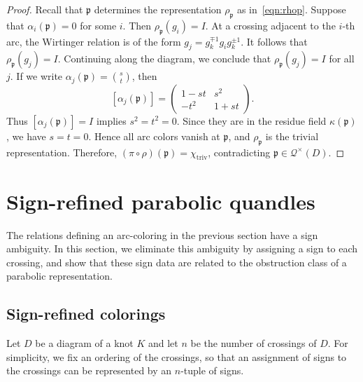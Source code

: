 \documentclass[12pt,reqno]{amsart}
\newcommand{\BC}{\mathbb{C}}
\newcommand{\calQ}{\mathcal{Q}}
\newcommand{\calG}{\mathcal{G}}
\newcommand{\calR}{\mathcal{R}}
\theoremstyle{definition}
\newtheorem{remark}[theorem]{Remark}
\begin{document}
	\begin{proof}
		Recall that $\mathfrak p$ determines the representation
		$\rho_{\mathfrak p}$ as in~\eqref{eqn:rhop}.
		Suppose that $\alpha_i(\mathfrak p)=0$ for some $i$. Then 
		$ \rho_{\mathfrak p}(g_i)=I$.
		At a crossing adjacent to the $i$-th arc, the Wirtinger
		relation is of the form $g_j=g_k^{\mp 1}g_i g_k^{\pm1}$.
		It follows that $\rho_{\mathfrak p}(g_j)=I$. Continuing along the  diagram, we conclude that $\rho_{\mathfrak p}(g_j)=I$ for all $j$.
		If we write $\alpha_j(\mathfrak p)=\binom{s}{t}$, then
		\[
		[\alpha_j(\mathfrak p)]
		=
		\begin{pmatrix}
			1-st & s^2\\
			-t^2 & 1+st
		\end{pmatrix}.
		\]
		Thus $[\alpha_j(\mathfrak p)]=I$ implies $s^2=t^2=0$. Since
		they are in the residue field $\kappa(\mathfrak p)$, we have $s=t=0$. Hence all arc
		colors vanish at $\mathfrak p$, and $\rho_{\mathfrak p}$ is the trivial
		representation.
		Therefore, $(\pi\circ\rho)(\mathfrak p)=\chi_{\mathrm{triv}}$,
		contradicting $\mathfrak p\in\calQ^\times(D)$.
	\end{proof}
	
	
	\section{Sign-refined parabolic quandles}\label{sec.quandle}
	
	The relations defining an arc-coloring in the previous section have a sign ambiguity. In this section, we eliminate this ambiguity by assigning a sign to each crossing, and show that these sign data are related to the obstruction class of a parabolic representation.
	
	
	
	\subsection{Sign-refined colorings}
	
	Let $D$ be a diagram of a knot $K$ and let $n$ be the number of crossings of $D$. 
	For simplicity, we fix an ordering of the crossings, so that an assignment of signs to the crossings can be represented by an $n$-tuple of signs.
	
\end{document}
